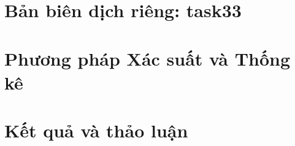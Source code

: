 \documentclass[13pt,a4paper,oneside]{extreport}
\begin{document}
\chapter*{Bản biên dịch riêng: task33}
\chapter{Phương pháp Xác suất và Thống kê}

\chapter{Kết quả và thảo luận}

\printbibliography
\end{document}
